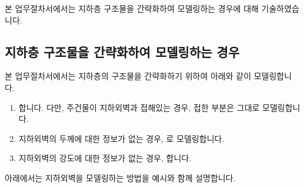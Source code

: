 \documentclass[a4paper,11pt,korean,openany,oneside]{sphinxmanual}
\begin{document}
\sphinxAtStartPar
본 업무절차서에서는 지하층 구조물을 간략화하여 모델링하는 경우에 대해 기술하였습니다.


\subsection{지하층 구조물을 간략화하여 모델링하는 경우}
\label{\detokenize{1_base_wall:id3}}
\sphinxAtStartPar
본 업무절차서에서는 지하층의 구조물을 간략화하기 위하여 아래와 같이 모델링합니다.
\begin{enumerate}
%
\item {} 
\sphinxAtStartPar
{}합니다. 다만, 주건물이 지하외벽과 접해있는 경우, 접한 부분은 그대로 모델링합니다.

\item {} 
\sphinxAtStartPar
지하외벽의 두께에 대한 정보가 없는 경우, 로 모델링합니다.

\item {} 
\sphinxAtStartPar
지하외벽의 강도에 대한 정보가 없는 경우, 합니다.

\end{enumerate}

\sphinxAtStartPar
아래에서는 지하외벽을 모델링하는 방법을 예시와 함께 설명합니다.
\end{document}
